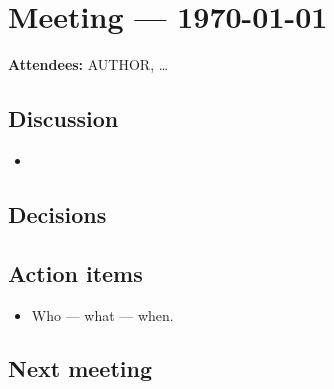 \documentclass[11pt]{article}
\begin{document}
\section*{Meeting — \today}
\textbf{Attendees:} {{AUTHOR}}, \dots
\subsection*{Discussion}
\begin{itemize}
  \item
\end{itemize}
\subsection*{Decisions}
\subsection*{Action items}
\begin{itemize}[label=$\square$]
  \item Who --- what --- when.
\end{itemize}
\subsection*{Next meeting}
\end{document}
